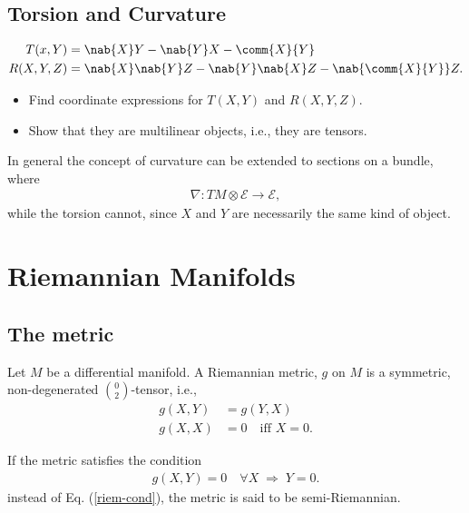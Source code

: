\section{Torsion and Curvature}

\begin{align}
  T(x,Y) &= \nab{X}Y-\nab{Y}X-\comm{X}{Y}\\
  R(X,Y,Z) &= \nab{X}\nab{Y}Z -\nab{Y}\nab{X}Z -\nab{\comm{X}{Y}}Z.
\end{align}

\begin{Ebox}
  \begin{itemize}
  \item Find coordinate expressions for $T(X,Y)$ and $R(X,Y,Z)$.
  \item Show that they are multilinear objects, i.e., they are tensors.
  \end{itemize}
\end{Ebox}
\bigskip
\begin{infobox}[frametitle={NOTE}]
  In general the concept of curvature can be extended to sections on a bundle, where 
  \begin{align*}
    \nabla:TM\otimes\mathcal{E}\to\mathcal{E},
  \end{align*}
  while the torsion cannot, since $X$ and $Y$ are necessarily the same kind of object.
\end{infobox}




\chapter{Riemannian Manifolds}

\section{The metric}

\begin{Def}
  Let $M$ be a differential manifold. A {\sc Riemannian metric}, $g$ on $M$ is a symmetric, non-degenerated $\binom{0}{2}$-tensor, i.e.,
  \begin{align}
    g(X,Y) &= g(Y,X)\\
    g(X,X) &= 0\quad\text{iff }X=0.\label{riem-cond}
  \end{align}
\end{Def}

If the metric satisfies the condition
\begin{align}
  g(X,Y) = 0\quad \forall X\;\Rightarrow\; Y=0.\label{sriem-cond}
\end{align}
instead of Eq. (\ref{riem-cond}), the metric is said to be semi-Riemannian.

